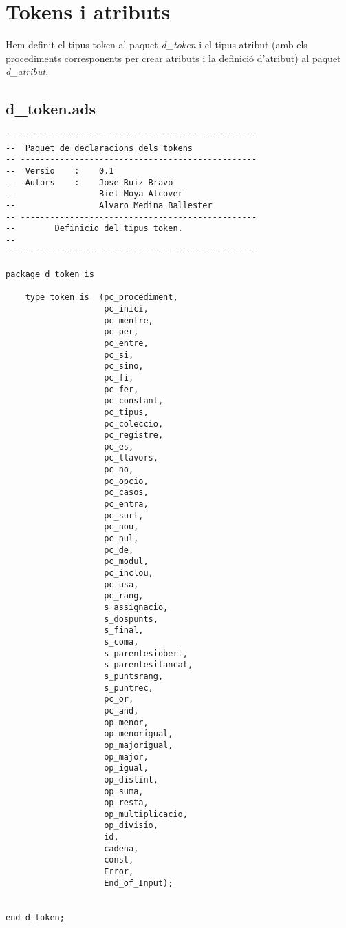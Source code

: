\documentclass[10pt]{report}
\begin{document}
    
    \section{Tokens i atributs}
    Hem definit el tipus token al paquet \textit{d\_token} i el tipus atribut (amb els procediments corresponents per crear atributs i la definició d'atribut) al paquet \textit{d\_atribut}.
    \subsection{d\_token.ads}
    \begin{lstlisting}[style=Ada]
-- ------------------------------------------------
--  Paquet de declaracions dels tokens
-- ------------------------------------------------
--  Versio    :    0.1
--  Autors    :    Jose Ruiz Bravo
--                 Biel Moya Alcover
--                 Alvaro Medina Ballester
-- ------------------------------------------------
--        Definicio del tipus token.
--
-- ------------------------------------------------

package d_token is

    type token is  (pc_procediment,
                    pc_inici,
                    pc_mentre,
                    pc_per,
                    pc_entre,
                    pc_si,
                    pc_sino,
                    pc_fi,
                    pc_fer,
                    pc_constant,
                    pc_tipus,
                    pc_coleccio,
                    pc_registre,
                    pc_es,
                    pc_llavors,
                    pc_no,
                    pc_opcio,
                    pc_casos,
                    pc_entra,
                    pc_surt,
                    pc_nou,
                    pc_nul,
                    pc_de,
                    pc_modul,
                    pc_inclou,
                    pc_usa,
                    pc_rang,
                    s_assignacio,
                    s_dospunts,
                    s_final,
                    s_coma,
                    s_parentesiobert,
                    s_parentesitancat,
                    s_puntsrang,
                    s_puntrec,
                    pc_or,
                    pc_and,
                    op_menor,
                    op_menorigual,
                    op_majorigual,
                    op_major,
                    op_igual,
                    op_distint,
                    op_suma,
                    op_resta,
                    op_multiplicacio,
                    op_divisio,
                    id,
                    cadena,
                    const,
                    Error,
                    End_of_Input);
            
                    
end d_token;
    \end{lstlisting}
    \newpage
    
\end{document}

